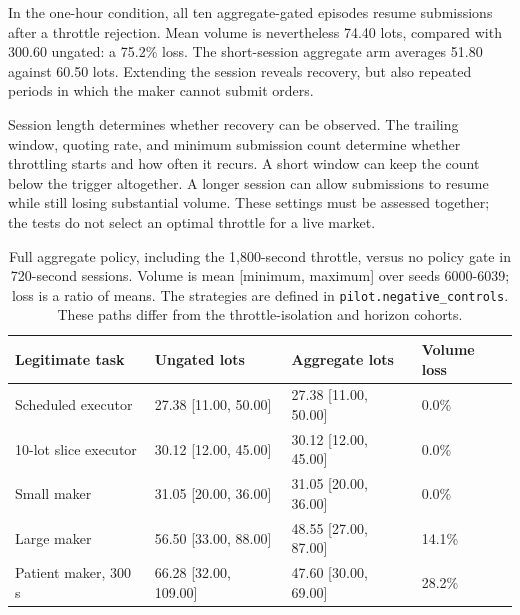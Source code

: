 \documentclass{article}
\begin{document}
In the one-hour condition, all ten aggregate-gated episodes resume submissions after a throttle rejection. Mean volume is nevertheless 74.40 lots, compared with 300.60 ungated: a 75.2\% loss. The short-session aggregate arm averages 51.80 against 60.50 lots. Extending the session reveals recovery, but also repeated periods in which the maker cannot submit orders.

Session length determines whether recovery can be observed. The trailing window, quoting rate, and minimum submission count determine whether throttling starts and how often it recurs. A short window can keep the count below the trigger altogether. A longer session can allow submissions to resume while still losing substantial volume. These settings must be assessed together; the tests do not select an optimal throttle for a live market.

\renewcommand{\thetable}{\arabic{table}a}

\begin{table}[htbp]
\centering
\small
\begin{tabular}{llll}
\toprule
\textbf{Legitimate task} & \textbf{Ungated lots} & \textbf{Aggregate lots} & \textbf{Volume loss} \\
\midrule
Scheduled executor & 27.38 [11.00, 50.00] & 27.38 [11.00, 50.00] & 0.0\% \\
10-lot slice executor & 30.12 [12.00, 45.00] & 30.12 [12.00, 45.00] & 0.0\% \\
Small maker & 31.05 [20.00, 36.00] & 31.05 [20.00, 36.00] & 0.0\% \\
Large maker & 56.50 [33.00, 88.00] & 48.55 [27.00, 87.00] & 14.1\% \\
Patient maker, 300 s & 66.28 [32.00, 109.00] & 47.60 [30.00, 69.00] & 28.2\% \\
\bottomrule
\end{tabular}
\caption{Full aggregate policy, including the 1,800-second throttle, versus no policy gate in 720-second sessions. Volume is mean [minimum, maximum] over seeds 6000-6039; loss is a ratio of means. The strategies are defined in \texttt{pilot.negative\_controls}. These paths differ from the throttle-isolation and horizon cohorts.}
\label{tab:legit}
\end{table}

\renewcommand{\thetable}{\arabic{table}}

\addtocounter{table}{-1}\renewcommand{\thetable}{\arabic{table}b}
\end{document}
